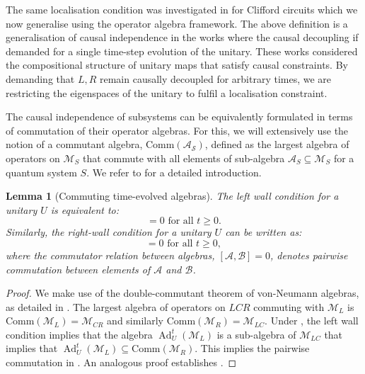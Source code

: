 \documentclass[11pt, twocolumn, floatfix, superscriptaddress, aps, prb, raggedbottom]{revtex4-2}
\newtheorem{lemma}[theorem]{Lemma}
\newcommand{\comm}{\mathrm{Comm}}
\DeclareMathOperator{\Ad}{Ad}
\begin{document}
The same localisation condition was investigated in \cite{Kovacs2026} for Clifford circuits which we now generalise using the operator algebra framework.
The above definition is a generalisation of causal independence in the works \cite{Lorenz2021, Allen2018} where the causal decoupling if demanded for a single time-step evolution of the unitary. These works considered the compositional structure of unitary maps that satisfy causal constraints. By demanding that $L,R$ remain causally decoupled for arbitrary times, we are restricting the eigenspaces of the unitary to fulfil a localisation constraint. 

The causal independence of subsystems can be equivalently formulated in terms of commutation of their operator algebras. For this, we will extensively use the notion of a commutant algebra, $\comm(\mathcal{A_S})$, defined as the largest algebra of operators on $\mathcal{M}_S$ that commute with all elements of sub-algebra $\mathcal{A}_S \subseteq \mathcal{M}_S$ for a quantum system $S$. We refer to  for a detailed introduction.

\begin{lemma}[Commuting time-evolved algebras]
    The left wall condition for a unitary $U$ is equivalent to:
    \begin{equation}
        [\Ad_U^t(\mathcal{M}_L), \mathcal{M}_R] = 0 \text{ for all } t \geq 0.
        \label{eq:left_commutator}
    \end{equation}
    Similarly, the right-wall condition for a unitary $U$ can be written as:
    \begin{equation}
        [\mathcal{M}_L,\Ad_U^t(\mathcal{M}_R)] = 0 \text{ for all } t \geq 0,
        \label{eq:right_commutator}
    \end{equation}
    where the commutator relation between algebras, $[\mathcal{A}, \mathcal{B}] = 0$, denotes pairwise commutation between elements of $\mathcal{A}$ and $\mathcal{B}$.
    \label{lemma:walls_as_commutators}
\end{lemma}
\begin{proof}
    We make use of the double-commutant theorem of von-Neumann algebras, as detailed in . The largest algebra of operators on $LCR$ commuting with $\mathcal{M}_L$ is $\comm(\mathcal{M}_L) = \mathcal{M}_{CR}$ and similarly $\comm(\mathcal{M}_R) = \mathcal{M}_{LC}$. Under , the left wall condition implies that the algebra $\Ad_U^t(\mathcal{M}_L)$ is a sub-algebra of $\mathcal{M}_{LC}$ that implies that $\Ad_U^t(\mathcal{M}_L) \subseteq \comm(\mathcal{M}_R)$. This implies the pairwise commutation in . An analogous proof establishes  .
\end{proof}
\end{document}
